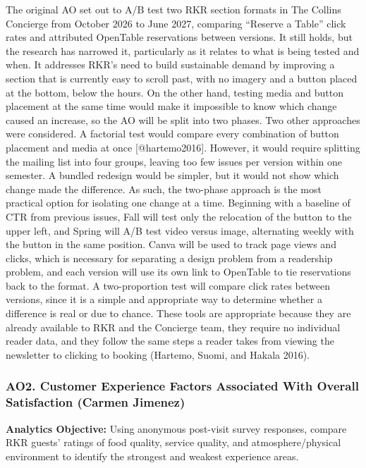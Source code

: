 \documentclass[
  12pt,
  letterpaper,
  DIV=11,
  numbers=noendperiod]{scrartcl}
\begin{document}
The original AO set out to A/B test two RKR section formats in The
Collins Concierge from October 2026 to June 2027, comparing ``Reserve a
Table'' click rates and attributed OpenTable reservations between
versions. It still holds, but the research has narrowed it, particularly
as it relates to what is being tested and when. It addresses RKR's need
to build sustainable demand by improving a section that is currently
easy to scroll past, with no imagery and a button placed at the bottom,
below the hours. On the other hand, testing media and button placement
at the same time would make it impossible to know which change caused an
increase, so the AO will be split into two phases. Two other approaches
were considered. A factorial test would compare every combination of
button placement and media at once {[}@hartemo2016{]}. However, it would
require splitting the mailing list into four groups, leaving too few
issues per version within one semester. A bundled redesign would be
simpler, but it would not show which change made the difference. As
such, the two-phase approach is the most practical option for isolating
one change at a time. Beginning with a baseline of CTR from previous
issues, Fall will test only the relocation of the button to the upper
left, and Spring will A/B test video versus image, alternating weekly
with the button in the same position. Canva will be used to track page
views and clicks, which is necessary for separating a design problem
from a readership problem, and each version will use its own link to
OpenTable to tie reservations back to the format. A two-proportion test
will compare click rates between versions, since it is a simple and
appropriate way to determine whether a difference is real or due to
chance. These tools are appropriate because they are already available
to RKR and the Concierge team, they require no individual reader data,
and they follow the same steps a reader takes from viewing the
newsletter to clicking to booking (Hartemo, Suomi, and Hakala 2016).

\subsubsection{AO2. Customer Experience Factors Associated With Overall
Satisfaction (Carmen
Jimenez)}\label{ao2.-customer-experience-factors-associated-with-overall-satisfaction-carmen-jimenez-1}

\textbf{Analytics Objective:} Using anonymous post-visit survey
responses, compare RKR guests' ratings of food quality, service quality,
and atmosphere/physical environment to identify the strongest and
weakest experience areas.
\end{document}
